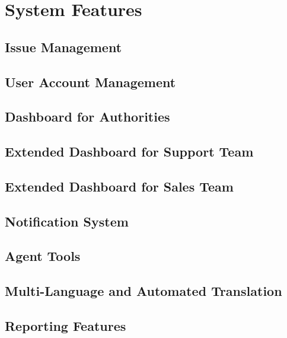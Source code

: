     \chapter{System Features}\label{ch:System Features}
        \section{Issue Management}
            
        \section{User Account Management}
            
        \section{Dashboard for Authorities}
            
        \section{Extended Dashboard for Support Team}
              
        \section{Extended Dashboard for Sales Team}
            
        \section{Notification System}
            
        \section{Agent Tools}
            
        \section{Multi-Language and Automated Translation}    
            
        \section{Reporting Features}
            
